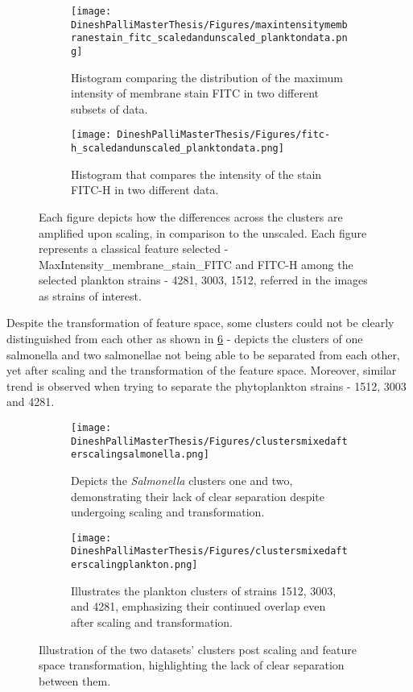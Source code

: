 \documentclass[12pt,a4paper]{article}
\begin{document}
\begin{figure}
  \centering
  \begin{subfigure}{0.45\linewidth}
    \texttt{[image: DineshPalliMasterThesis/Figures/maxintensitymembranestain\_fitc\_scaledandunscaled\_planktondata.png]}
    \caption{Histogram comparing the distribution of the maximum intensity of membrane stain FITC in two different subsets of data.}
    \label{multifig2:image_a}
  \end{subfigure}
  \hfill
  \begin{subfigure}{0.4\linewidth}
    \texttt{[image: DineshPalliMasterThesis/Figures/fitc-h\_scaledandunscaled\_planktondata.png]}
    \caption{Histogram that compares the intensity of the stain FITC-H in two different data.}
    \label{multifig2:image_b}
  \end{subfigure}
  \caption{Each figure depicts how the differences across the clusters are amplified upon scaling, in comparison to the unscaled. Each figure represents a classical feature selected - MaxIntensity\_membrane\_stain\_FITC and FITC-H among the selected plankton strains - 4281, 3003, 1512, referred in the images as strains of interest.}
  \label{multifig2:overall_figure}
\end{figure}

Despite the transformation of feature space, some clusters could not be clearly distinguished from each other as shown in \ref{multifig3:overall_figure} - depicts the clusters of one salmonella and two salmonellae not being able to be separated from each other, yet after scaling and the transformation of the feature space. Moreover, similar trend is observed when trying to separate the phytoplankton strains - 1512, 3003 and 4281.

\begin{figure}
  \centering
  \begin{subfigure}{0.5\linewidth}
    \texttt{[image: DineshPalliMasterThesis/Figures/clustersmixedafterscalingsalmonella.png]}
    \caption{Depicts the \textit{Salmonella} clusters one and two, demonstrating their lack of clear separation despite undergoing scaling and transformation.}
    \label{multifig3:image_a}
  \end{subfigure}
  \hfill
  \begin{subfigure}{0.5\linewidth}
    \texttt{[image: DineshPalliMasterThesis/Figures/clustersmixedafterscalingplankton.png]}
    \caption{Illustrates the plankton clusters of strains 1512, 3003, and 4281, emphasizing their continued overlap even after scaling and transformation.}
    \label{multifig3:image_b}
  \end{subfigure}
  \caption{Illustration of the two datasets' clusters post scaling and feature space transformation, highlighting the lack of clear separation between them.}
  \label{multifig3:overall_figure}
\end{figure}
\end{document}
